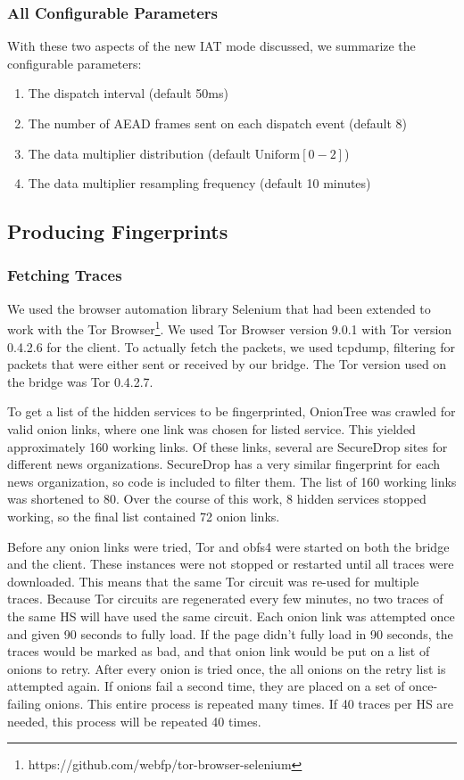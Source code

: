\documentclass[11pt]{article}
\begin{document}
\subsubsection{All Configurable Parameters}
With these two aspects of the new IAT mode discussed, we summarize the configurable parameters:
\begin{enumerate}
    \item The dispatch interval (default 50ms)
    \item The number of AEAD frames sent on each dispatch event (default 8)
    \item The data multiplier distribution (default $\text{Uniform}[0-2]$)
    \item The data multiplier resampling frequency (default 10 minutes)
\end{enumerate}

\subsection{Producing Fingerprints}
\subsubsection{Fetching Traces}
We used the browser automation library Selenium that had been extended to work with the Tor Browser\footnote{https://github.com/webfp/tor-browser-selenium}. We used Tor Browser version 9.0.1 with Tor version 0.4.2.6 for the client. To actually fetch the packets, we used tcpdump, filtering for packets that were either sent or received by our bridge. The Tor version used on the bridge was Tor 0.4.2.7.

To get a list of the hidden services to be fingerprinted, OnionTree was crawled for valid onion links, where one link was chosen for listed service. This yielded approximately 160 working links. Of these links, several are SecureDrop sites for different news organizations. SecureDrop has a very similar fingerprint for each news organization, so code is included to filter them. The list of 160 working links was shortened to 80. Over the course of this work, 8 hidden services stopped working, so the final list contained 72 onion links.

Before any onion links were tried, Tor and obfs4 were started on both the bridge and the client. These instances were not stopped or restarted until all traces were downloaded. This means that the same Tor circuit was re-used for multiple traces. Because Tor circuits are regenerated every few minutes, no two traces of the same HS will have used the same circuit. Each onion link was attempted once and given 90 seconds to fully load. If the page didn't fully load in 90 seconds, the traces would be marked as bad, and that onion link would be put on a list of onions to retry. After every onion is tried once, the all onions on the retry list is attempted again. If onions fail a second time, they are placed on a set of once-failing onions. This entire process is repeated many times. If 40 traces per HS are needed, this process will be repeated 40 times.
\end{document}
